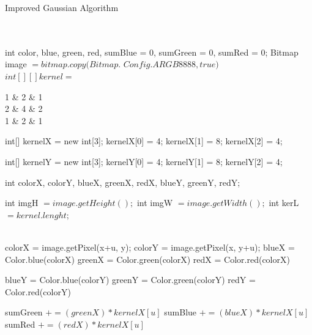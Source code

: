 \documentclass[conference]{IEEEtran}
\begin{document}
\begin{algorithm}
   \caption{Improved Gaussian Algorithm}
    \begin{algorithmic}[1]
      \\
		\\
        \State int color, blue, green, red, sumBlue = 0, sumGreen = 0,				 \State sumRed = 0;
        \State  Bitmap image $= bitmap.copy(Bitmap.$
        \State $Config.ARGB8888, true)$
\\          
        
        

		\State $int[ ][ ] kernel =$
		\State \begin{bmatrix}
                1  & 2 & 1 \\
                2  & 4 & 2 \\
                1  & 2 & 1
                \end{bmatrix}
        \State int[] kernelX = new int[3];
        \State kernelX[0] = 4;
        \State kernelX[1] = 8;
        \State kernelX[2] = 4;

        \State int[] kernelY = new int[3];
        \State kernelY[0] = 4;
        \State kernelY[1] = 8;
        \State kernelY[2] = 4;
        
        \State int colorX, colorY, blueX, greenX, redX,
                blueY, greenY, redY;

         \State int imgH $= image.getHeight(); $
        \State int imgW $= image.getWidth(); $
       \State int kerL $= kernel.lenght; $
        
\\
					        \State colorX = image.getPixel(x+u, y); 
                            \State colorY = image.getPixel(x, y+u);
						    \State blueX = Color.blue(colorX)
            				\State greenX = Color.green(colorX)
            				\State redX = Color.red(colorX)
            				
            				\State blueY = Color.blue(colorY)
            				\State greenY = Color.green(colorY)
            				\State redY = Color.red(colorY)
            				
            				\State sumGreen $+= (greenX)*kernelX[u]$
            				\State sumBlue $+= (blueX)*kernelX[u]$
            				\State sumRed $+= (redX)*kernelX[u]$
            				

\end{algorithmic}
\end{algorithm}
\end{document}
